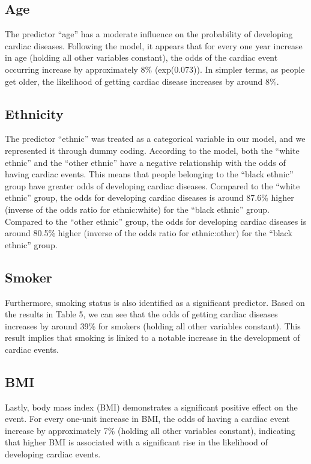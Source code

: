 \documentclass[12pt]{article}
\begin{document}
\subsection*{Age}
The predictor “age” has a moderate influence on the probability of developing cardiac diseases. Following the model, it appears that for every one year increase in age (holding all other variables constant), the odds of the cardiac event occurring increase by approximately 8\% (exp(0.073)). In simpler terms, as people get older, the likelihood of getting cardiac disease increases by around 8\%.

\subsection*{Ethnicity}
The predictor “ethnic” was treated as a categorical variable in our model, and we represented it through dummy coding. According to the model, both the “white ethnic” and the “other ethnic” have a negative relationship with the odds of having cardiac events. This means that people belonging to the “black ethnic” group have greater odds of developing cardiac diseases. Compared to the “white ethnic” group, the odds for developing cardiac diseases is around 87.6\% higher (inverse of the odds ratio for ethnic:white) for the  “black ethnic” group. Compared to the “other ethnic” group, the odds for developing cardiac diseases is around 80.5\% higher (inverse of the odds ratio for ethnic:other) for the  “black ethnic” group.

\subsection*{Smoker}
Furthermore, smoking status is also identified as a significant predictor. Based on the results in Table 5, we can see that the odds of getting cardiac diseases increases by around 39\% for smokers (holding all other variables constant). This result implies that smoking is linked to a notable increase in the development of cardiac events.

\subsection*{BMI}
Lastly, body mass index (BMI) demonstrates a significant positive effect on the event. For every one-unit increase in BMI, the odds of having a cardiac event increase by approximately 7\% (holding all other variables constant), indicating that higher BMI is associated with a significant rise in the likelihood of developing cardiac events.
\end{document}

